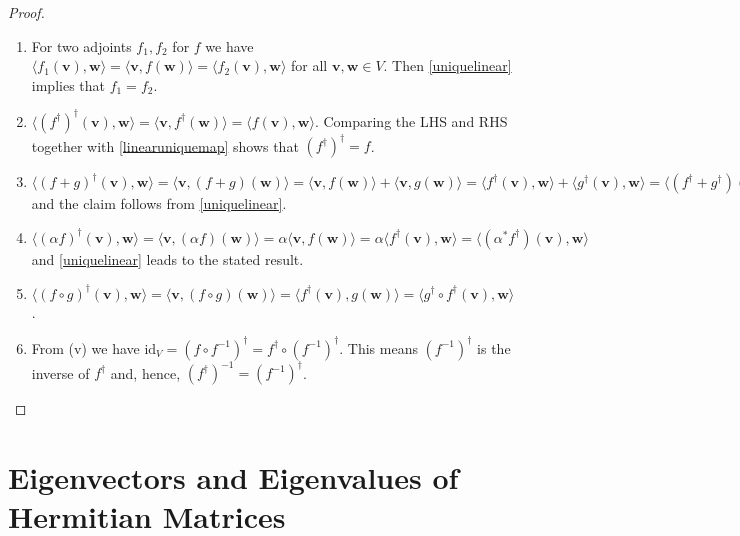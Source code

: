 \documentclass[a4paper,12pt]{report}
\begin{document}
\begin{appendices}
\begin{proof}
    \begin{enumerate}[label=(\(M\)\arabic*)]
        \item For two adjoints \(f_1, f_2\) for \(f\) we have \(\langle f_1(\mathbf{v}), \mathbf{w} \rangle = \langle \mathbf{v}, f(\mathbf{w}) \rangle = \langle f_2(\mathbf{v}), \mathbf{w} \rangle\) for all \(\mathbf{v}, \mathbf{w} \in V\). Then \cref{uniquelinear} implies that \(f_1 = f_2\).
        \item \(\langle (f^\dagger)^\dagger(\mathbf{v}), \mathbf{w} \rangle = \langle \mathbf{v}, f^\dagger(\mathbf{w}) \rangle = \langle f(\mathbf{v}), \mathbf{w} \rangle\). Comparing the LHS and RHS together with \cref{linearuniquemap} shows that \((f^\dagger)^\dagger = f\).
        \item \(\langle (f+g)^\dagger(\mathbf{v}), \mathbf{w} \rangle = \langle \mathbf{v}, (f+g)(\mathbf{w}) \rangle = \langle \mathbf{v}, f(\mathbf{w}) \rangle + \langle \mathbf{v}, g(\mathbf{w}) \rangle = \langle f^\dagger(\mathbf{v}), \mathbf{w} \rangle + \langle g^\dagger(\mathbf{v}), \mathbf{w} \rangle = \langle (f^\dagger + g^\dagger)(\mathbf{v}), \mathbf{w} \rangle\) and the claim follows from \cref{uniquelinear}.
        \item \(\langle (\alpha f)^\dagger(\mathbf{v}), \mathbf{w} \rangle = \langle \mathbf{v}, (\alpha f)(\mathbf{w}) \rangle = \alpha \langle \mathbf{v}, f(\mathbf{w}) \rangle = \alpha \langle f^\dagger(\mathbf{v}), \mathbf{w} \rangle = \langle (\alpha^* f^\dagger)(\mathbf{v}), \mathbf{w} \rangle\) and \cref{uniquelinear} leads to the stated result.
        \item \(\langle (f \circ g)^\dagger(\mathbf{v}), \mathbf{w} \rangle = \langle \mathbf{v}, (f \circ g)(\mathbf{w}) \rangle = \langle f^\dagger(\mathbf{v}), g(\mathbf{w}) \rangle = \langle g^\dagger \circ f^\dagger(\mathbf{v}), \mathbf{w} \rangle\).
        \item From (v) we have \(\text{id}_V = (f \circ f^{-1})^\dagger = f^\dagger \circ (f^{-1})^\dagger\). This means \((f^{-1})^\dagger\) is the inverse of \(f^\dagger\) and, hence, \((f^\dagger)^{-1} = (f^{-1})^\dagger\).
    \end{enumerate}
\end{proof}

\section{Eigenvectors and Eigenvalues of Hermitian Matrices} \label{eigenapp} 


\end{appendices}
\end{document}
